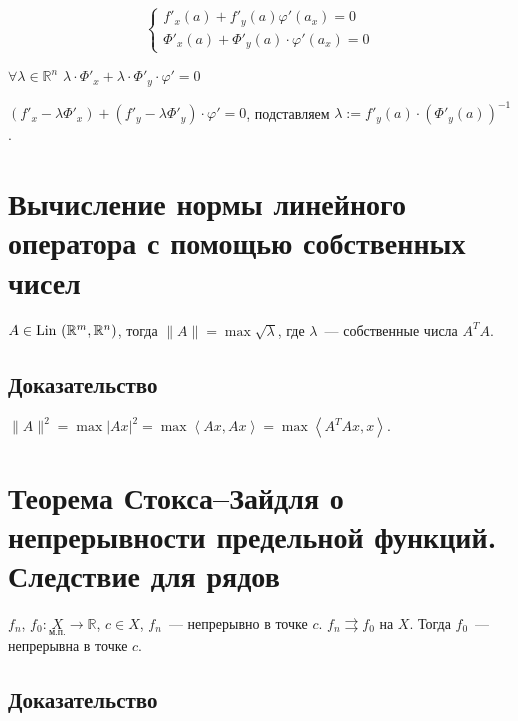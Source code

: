\documentclass{article}
\begin{document}
            \begin{equation*}
                \begin{cases}
                
                    f'_x(a) + f'_y(a)\varphi'(a_x) = 0 \\
                    
                    \Phi'_x(a) + \Phi'_y(a) \cdot \varphi'(a_x) = 0
                    
                \end{cases}
            \end{equation*}
            
            $\forall \lambda \in \mathbb{R}^n$ $\lambda \cdot \Phi'_x + \lambda \cdot \Phi'_y \cdot \varphi' = 0$
            
            $(f'_x - \lambda \Phi'_x) + (f'_y - \lambda \Phi'_y) \cdot \varphi' = 0$, подставляем $\lambda := f'_y(a) \cdot \left( \Phi'_y (a) \right)^{-1}$.
            
    \newpage
    
    \section{Вычисление нормы линейного оператора с помощью собственных чисел}
    
        $A \in \Lin (\RM, \mathbb{R}^n)$, тогда $\| A \| = \max \sqrt{\lambda}$, где $\lambda$~--- собственные числа $A^T A$.
        
        \subsection{Доказательство}
        
            $\| A \|^2 = \max | Ax |^2 = \max \left\langle Ax, Ax \right\rangle = \max \left\langle A^T Ax, x \right\rangle$.
    
    \newpage
    
    \section{Теорема Стокса--Зайдля о непрерывности предельной функций. Следствие для рядов}
    
        $f_n$, $f_0 : \underset{\text{м.п.}}{X} \rightarrow \mathbb{R}$, $c \in X$, $f_n$~--- непрерывно в точке $c$. $f_n \rightrightarrows f_0$ на $X$. Тогда $f_0$~--- непрерывна в точке $c$.
        
        \subsection{Доказательство}
        
\end{document}
